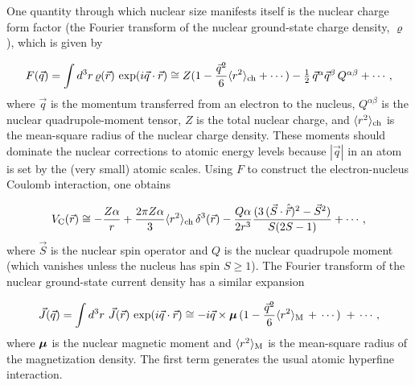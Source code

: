 \documentclass{svmult}
\begin{document}
One quantity through which nuclear size manifests itself is the nuclear charge
form factor (the Fourier transform of the nuclear ground-state charge
density, $\varrho$), which is given by
\pagebreak

\begin{equation}
F (\vec{q}) = \int d^3 r \, \varrho (\vec{r}) \, \exp (i \vec{q} \cdot \vec{r}) 
\cong Z (1- \frac{\vec{q}^2}{6}\langle r^2 \rangle_{\rm ch} + \cdots \, ) 
- \textstyle{1\over2} \, \vec{q}^{\alpha} \vec{q}^{\beta}\, Q^{\alpha \beta} + 
\cdots \, ,
\end{equation}
where $\vec{q}$ is the momentum transferred from an electron to the nucleus,
$Q^{\alpha \beta}$ is the nuclear quadrupole-moment tensor, $Z$ is the total
nuclear charge, and $\langle r^2 \rangle_{\rm ch}$ is the mean-square radius of
the nuclear charge density. These moments should dominate the nuclear 
corrections to atomic energy levels because $|\vec{q}|$ in an atom is set by 
the (very small) atomic scales. Using $F$ to construct the electron-nucleus 
Coulomb interaction, one obtains

\begin{equation}
V_{\rm C} ( \vec{r} ) \cong - \frac{Z \alpha}{r} + \frac{2 \pi Z \alpha}{3} 
\langle r^2 \rangle_{\rm ch} \, \delta^3 (\vec{r}) - \frac{Q \alpha}{2 r^3} 
\frac{( 3 \, (\vec{S} \cdot \hat{\vec{r}})^2 -\vec{S}^2)}{S (2 S-1)} + 
\cdots \, ,
\end{equation}
where $\vec{S}$ is the nuclear spin operator and $Q$ is the nuclear quadrupole
moment (which vanishes
unless the nucleus has spin $S \geq 1$). The Fourier transform of the nuclear
ground-state current density  has a similar
expansion

\begin{equation}
\vec{J} ( \vec{q} ) = \int d^3 r \  \vec{J} (\vec{r}) \, \exp ( i \vec{q} 
\cdot \vec{r} ) \cong -i \vec{q} \times \mbox{\boldmath $\mu$} \, (1- 
\frac{\vec{q}^2}{6} \langle r^2 \rangle_{\rm M}\, + \, \cdots \, ) \; + \, 
\cdots \, ,
\end{equation}
where $\mbox{\boldmath{$\mu$}}$ is the nuclear magnetic
moment and $\langle r^2 \rangle_{\rm M}$ is the
mean-square radius of the magnetization
density. The first term generates the usual atomic
hyperfine interaction.
\end{document}
